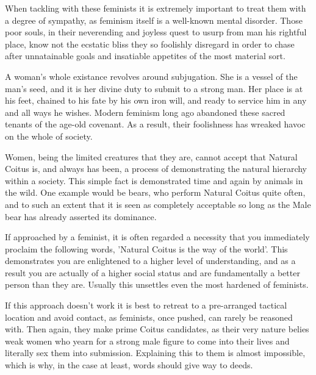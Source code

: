 When tackling with these feminists it is extremely important to treat them with a degree of sympathy, as
feminism itself is a well-known mental disorder. Those poor souls, in their neverending and joyless quest
to usurp from man his rightful place, know not the ecstatic bliss they so foolishly disregard in order
to chase after unnatainable goals and insatiable appetites of the most material sort.

A woman's whole existance revolves around subjugation. She is a vessel of the man's seed, and it is her
divine duty to submit to a strong man. Her place is at his feet, chained to his fate by his own iron will,
and ready to service him in any and all ways he wishes. Modern feminism long ago abandoned these sacred
tenants of the age-old covenant. As a result, their foolishness has wreaked havoc on the whole of society.

Women, being the limited creatures that they are, cannot accept that Natural Coitus is, and always has been,
a process of demonstrating the natural hierarchy within a society. This simple fact is demonstrated time and
again by animals in the wild. One example would be bears, who perform Natural Coitus quite often, and to such
an extent that it is seen as completely acceptable so long as the Male bear has already asserted its dominance.

If approached by a feminist, it is often regarded a necessity that you immediately proclaim the following
words, 'Natural Coitus is the way of the world'. This demonstrates you are enlightened to a higher level of
understanding, and as a result you are actually of a higher social status and are fundamentally a better
person than they are. Usually this unsettles even the most hardened of feminists.

If this approach doesn't work it is best to retreat to a pre-arranged tactical location and avoid contact,
as feminists, once pushed, can rarely be reasoned with. Then again, they make prime Coitus candidates, as 
their very nature belies weak women who yearn for a strong male figure to come into their lives and 
literally sex them into submission. Explaining this to them is almost impossible, which is why, in
the case at least, words should give way to deeds.
